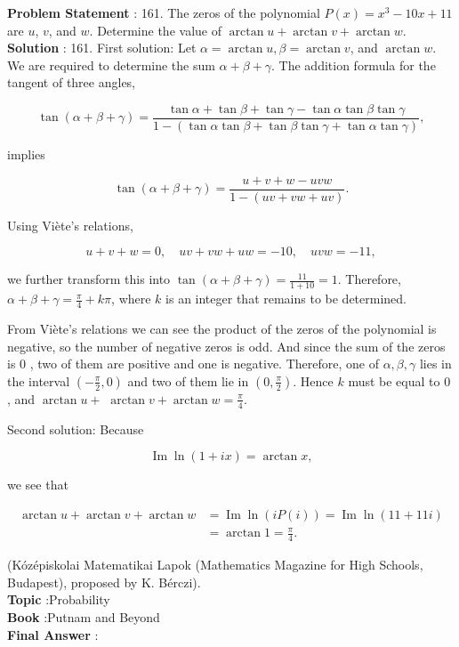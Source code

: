 \documentclass[10pt]{article}
\begin{document}
\textbf{Problem Statement} :
161. The zeros of the polynomial $P(x)=x^{3}-10 x+11$ are $u$, $v$, and $w$. Determine the value of $\arctan u+\arctan v+\arctan w$.
\\
\textbf{Solution} :
161. First solution: Let $\alpha=\arctan u, \beta=\arctan v$, and $\arctan w$. We are required to determine the sum $\alpha+\beta+\gamma$. The addition formula for the tangent of three angles, 

$$
\tan (\alpha+\beta+\gamma)=\frac{\tan \alpha+\tan \beta+\tan \gamma-\tan \alpha \tan \beta \tan \gamma}{1-(\tan \alpha \tan \beta+\tan \beta \tan \gamma+\tan \alpha \tan \gamma)},
$$

implies

$$
\tan (\alpha+\beta+\gamma)=\frac{u+v+w-u v w}{1-(u v+v w+u v)} .
$$

Using Viète's relations,

$$
u+v+w=0, \quad u v+v w+u w=-10, \quad u v w=-11,
$$

we further transform this into $\tan (\alpha+\beta+\gamma)=\frac{11}{1+10}=1$. Therefore, $\alpha+\beta+\gamma=\frac{\pi}{4}+k \pi$, where $k$ is an integer that remains to be determined.

From Viète's relations we can see the product of the zeros of the polynomial is negative, so the number of negative zeros is odd. And since the sum of the zeros is 0 , two of them are positive and one is negative. Therefore, one of $\alpha, \beta, \gamma$ lies in the interval $\left(-\frac{\pi}{2}, 0\right)$ and two of them lie in $\left(0, \frac{\pi}{2}\right)$. Hence $k$ must be equal to 0 , and $\arctan u+$ $\arctan v+\arctan w=\frac{\pi}{4}$.

Second solution: Because

$$
\operatorname{Im} \ln (1+i x)=\arctan x,
$$

we see that

$$
\begin{aligned}
\arctan u+\arctan v+\arctan w &=\operatorname{Im} \ln (i P(i))=\operatorname{Im} \ln (11+11 i) \\
&=\arctan 1=\frac{\pi}{4} .
\end{aligned}
$$

(Kózépiskolai Matematikai Lapok (Mathematics Magazine for High Schools, Budapest), proposed by K. Bérczi).
\\
\textbf{Topic} :Probability\\
\textbf{Book} :Putnam and Beyond\\
\textbf{Final Answer} :\\
\end{document}
